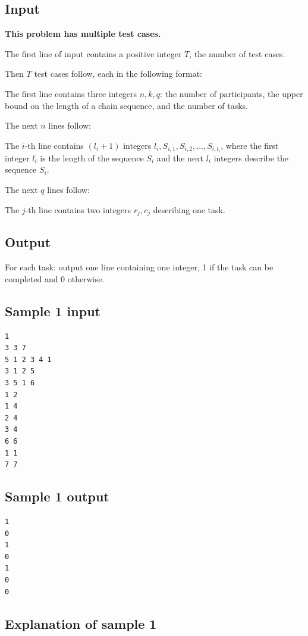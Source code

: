 \documentclass[11pt]{article}
\begin{document}
\subsection*{Input}

\textbf{This problem has multiple test cases.}

The first line of input contains a positive integer $T$, the number of test
cases.

Then $T$ test cases follow, each in the following format:

The first line contains three integers $n, k, q$: the number of
participants, the upper bound on the length of a chain sequence, and the
number of tasks.

The next $n$ lines follow:

The $i$-th line contains $(l_i + 1)$ integers
$l_i, S_{i,1}, S_{i,2}, \dots, S_{i,l_i}$, where the first integer $l_i$ is
the length of the sequence $S_i$ and the next $l_i$ integers describe the
sequence $S_i$.

The next $q$ lines follow:

The $j$-th line contains two integers $r_j, c_j$ describing one task.

\subsection*{Output}

For each task: output one line containing one integer, 1 if the task can be
completed and 0 otherwise.

\newpage
\subsection*{Sample 1 input}

\begin{verbatim}
1
3 3 7
5 1 2 3 4 1
3 1 2 5
3 5 1 6
1 2
1 4
2 4
3 4
6 6
1 1
7 7
\end{verbatim}

\subsection*{Sample 1 output}

\begin{verbatim}
1
0
1
0
1
0
0
\end{verbatim}

\subsection*{Explanation of sample 1}
\end{document}
